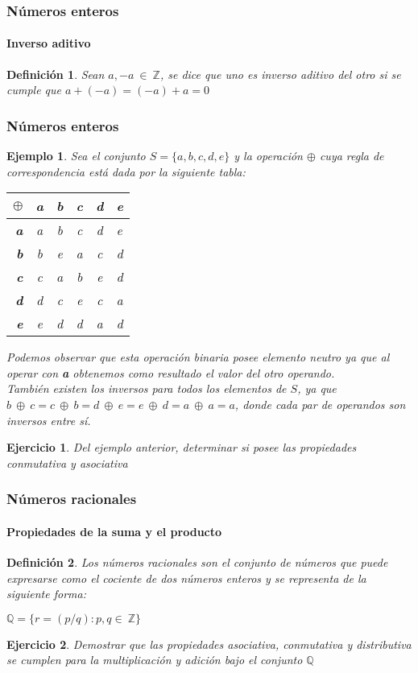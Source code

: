 \documentclass[11pt]{beamer}
\newtheorem{defi}{Definición}
\newtheorem{eje}{Ejercicio}
\newtheorem{ejem}{Ejemplo}
\begin{document}
\begin{frame}
\frametitle{Números enteros}
\framesubtitle{Inverso aditivo}
\begin{defi}
Sean $a,-a~\in~\mathbb{Z}$, se dice que uno es inverso aditivo del otro si se cumple que $a + (-a) = (-a) + a = 0$
\end{defi} 
\end{frame}

\begin{frame}
\frametitle{Números enteros}
\begin{ejem}
Sea el conjunto $S = \{a,b,c,d,e\}$ y la operación $\oplus$ cuya regla de correspondencia está dada por la siguiente tabla: \\
\begin{center}
\begin{tabular}{| r | c | c | c | c | l |}
\hline
\textbf{$\oplus$} & \textbf{a} & \textbf{b} & \textbf{c} & \textbf{d} & \textbf{e}	\\ \hline
\textbf{a} & a & b & c & d & e \\
\textbf{b} & b & e & a & c & d \\
\textbf{c} & c & a & b & e & d \\ 
\textbf{d} & d & c & e & c & a \\ 
\textbf{e} & e & d & d & a & d \\ \hline
\end{tabular}
\end{center}
Podemos observar que esta operación binaria posee elemento neutro ya que al operar con \textbf{a} obtenemos como resultado el valor del otro operando.\\
También existen los inversos para todos los elementos de $S$, ya que $b~\oplus~c = c~\oplus~b = d~\oplus~e = e~\oplus~d = a~\oplus~a = a$, donde cada par de operandos son inversos entre sí.
\end{ejem}
\end{frame}

\begin{frame}
\begin{eje}
Del ejemplo anterior, determinar si posee las propiedades conmutativa y asociativa
\end{eje}
\end{frame}

\begin{frame}
\frametitle{Números racionales}
\framesubtitle{Propiedades de la suma y el producto}
\begin{defi}
Los números racionales son el conjunto de números que puede expresarse como el cociente de dos números enteros y se
representa de la siguiente forma:\\
\begin{center}
$\mathbb{Q} = \{r = (p/q): p,q\in~\mathbb{Z}\}$
\end{center}
\end{defi} 
\begin{eje}
Demostrar que las propiedades asociativa, conmutativa y distributiva se cumplen para la multiplicación y adición bajo el 
conjunto $\mathbb{Q}$ 
\end{eje}
\end{frame}
\end{document}
